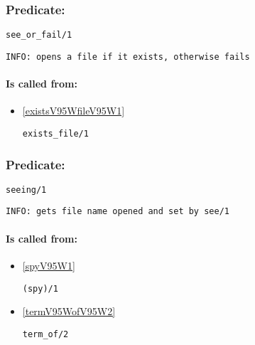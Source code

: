 \subsubsection{Predicate:} \label{seeV95WorV95WfailV95W1}

\begin{verbatim}
see_or_fail/1
\end{verbatim}

{\small \begin{verbatim}
INFO: opens a file if it exists, otherwise fails

\end{verbatim}}
\paragraph{Is called from:} 
\begin{itemize}
\item \ref{existsV95WfileV95W1} 
\begin{verbatim}
exists_file/1
\end{verbatim}

\end{itemize}

\subsubsection{Predicate:} \label{seeingV95W1}

\begin{verbatim}
seeing/1
\end{verbatim}

{\small \begin{verbatim}
INFO: gets file name opened and set by see/1

\end{verbatim}}
\paragraph{Is called from:} 
\begin{itemize}
\item \ref{spyV95W1} 
\begin{verbatim}
(spy)/1
\end{verbatim}

\item \ref{termV95WofV95W2} 
\begin{verbatim}
term_of/2
\end{verbatim}

\end{itemize}


